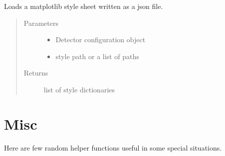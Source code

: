 \documentclass[letterpaper,10pt,english]{sphinxmanual}
\begin{document}
\begin{fulllineitems}
\label{\detokenize{autodocs/utils:listmode.utils.load_style_sheet}}
\sphinxAtStartPar
Loads a matplotlib style sheet written as a json file.
\begin{quote}\begin{description}
\item[{Parameters}] \leavevmode\begin{itemize}
\item {} 
\sphinxAtStartPar
{} \textendash{} Detector configuration object

\item {} 
\sphinxAtStartPar
{} \textendash{} style path or a list of paths

\end{itemize}

\item[{Returns}] \leavevmode
\sphinxAtStartPar
list of style dictionaries

\end{description}\end{quote}

\end{fulllineitems}



\section{Misc}
\label{\detokenize{autodocs/misc:misc}}\label{\detokenize{autodocs/misc::doc}}
\sphinxAtStartPar
Here are few random helper functions useful in some special situations.

\label{\detokenize{autodocs/misc:module-listmode.misc}}
\end{document}
